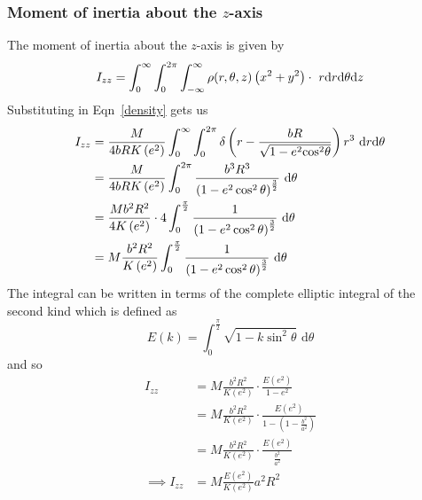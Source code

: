 \subsubsection{Moment of inertia about the \texorpdfstring{\( z \)}{z}-axis}
The moment of inertia about the \( z \)-axis is given by
\begin{equation}
    I_{zz} = \int_{0}^{\infty} \int_{0}^{2\pi} \int_{-\infty}^{\infty} \rho(r, \theta, z) \left(x^2 + y^2\right) \cdot \,{}\,{} r \textrm{d}{r}\textrm{d}{\theta}\textrm{d}{z}
\end{equation}
Substituting in Eqn~\ref{density} gets us
\begin{align}
    I_{zz} & = \frac{M}{4bRK\left(e^2\right)} \int_{0}^{\infty} \int_{0}^{2\pi} \delta\left(r - \frac{bR}{\sqrt{1 - e^2{\cos}^{2}{\theta}}}\right) r^3 \,{}\,{} \textrm{d}{r}\textrm{d}{\theta} \nonumber \\
           & = \frac{M}{4bRK\left(e^2\right)} \int_{0}^{2\pi} \frac{b^3 R^3}{{\left(1 - e^2 \cos^2{\theta}\right)}^{\frac{3}{2}}} \,{}\,{} \textrm{d}{\theta} \nonumber                            \\
           & = \frac{M b^2 R^2}{4K\left(e^2\right)} \cdot 4 \int_{0}^{\frac{\pi}{2}} \frac{1}{{\left(1 - e^2 \cos^2{\theta}\right)}^{\frac{3}{2}}} \,{}\,{} \textrm{d}{\theta} \nonumber           \\
           & = M \frac{b^2 R^2}{K\left(e^2\right)} \int_{0}^{\frac{\pi}{2}} \frac{1}{{\left(1 - e^2 \cos^2{\theta}\right)}^{\frac{3}{2}}} \,{}\,{} \textrm{d}{\theta} \nonumber
\end{align}
The integral can be written in terms of the complete elliptic integral of the second kind
which is defined as
\begin{equation}
    E(k) = \int_{0}^{\frac{\pi}{2}} \sqrt{1 - k \sin^2{\theta}} \,{}\,{} \mathrm{d}\theta
\end{equation}
and so
\begin{align}
    I_{zz}          & = M \frac{b^2 R^2}{K\left(e^2\right)} \cdot \frac{E\left(e^2\right)}{1 - e^2}  \nonumber                              \\
                    & = M \frac{b^2 R^2}{K\left(e^2\right)} \cdot \frac{E\left(e^2\right)}{1 - \left(1 - \frac{b^2}{a^2}\right)}  \nonumber \\
                    & = M \frac{b^2 R^2}{K\left(e^2\right)} \cdot \frac{E\left(e^2\right)}{\frac{b^2}{a^2}}  \nonumber                      \\
    \implies I_{zz} & = M \frac{E\left(e^2\right)}{K\left(e^2\right)} a^2 R^2
\end{align}

